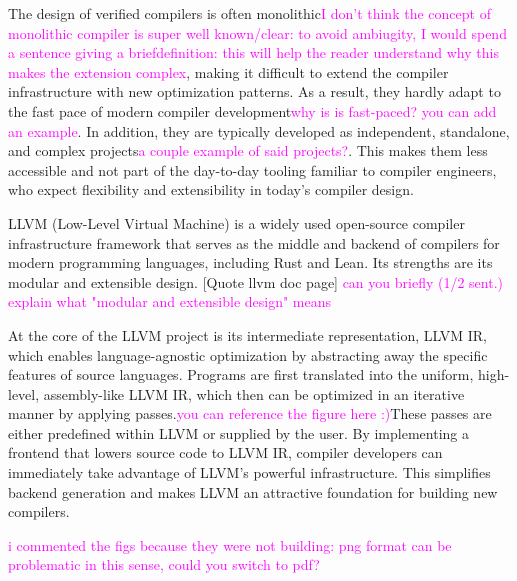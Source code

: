 The design of verified compilers is often monolithic\textcolor{magenta}{I don't think the concept of monolithic compiler is super well known/clear: to avoid ambiugity, I would spend a sentence giving a briefdefinition: this will help the reader understand why this makes the extension complex}, making it difficult to extend the compiler infrastructure with new optimization patterns. As a result, they hardly adapt to the fast pace of modern compiler development\textcolor{magenta}{why is is fast-paced? you can add an example}. In addition, they are typically developed as independent, standalone, and complex projects\textcolor{magenta}{a couple example of said projects?}. This makes them less accessible and not part of the day-to-day tooling familiar to compiler engineers, who expect flexibility and extensibility in today's compiler design.

LLVM (Low-Level Virtual Machine) is a widely used open-source compiler infrastructure framework that serves as the middle and backend of compilers for  modern programming languages, including Rust and Lean. Its strengths are its modular and extensible design. [Quote llvm doc page] \textcolor{magenta}{can you briefly (1/2 sent.) explain what "modular and extensible design" means}

At the core of the LLVM project is its intermediate representation, LLVM IR, which enables language-agnostic optimization by abstracting away the specific features of source languages. Programs are first translated into the uniform, high-level, assembly-like LLVM IR, which then can be optimized in an iterative manner by applying passes.\textcolor{magenta}{you can reference the figure here :)}These passes are either predefined within LLVM or supplied by the user. By implementing a frontend that lowers source code to LLVM IR, compiler developers can immediately take advantage of LLVM's powerful infrastructure. This  simplifies backend generation and makes LLVM an attractive foundation for building new compilers.

%   
\textcolor{magenta}{i commented the figs because they were not building: 
png format can be problematic in this sense, could you switch to pdf?}

